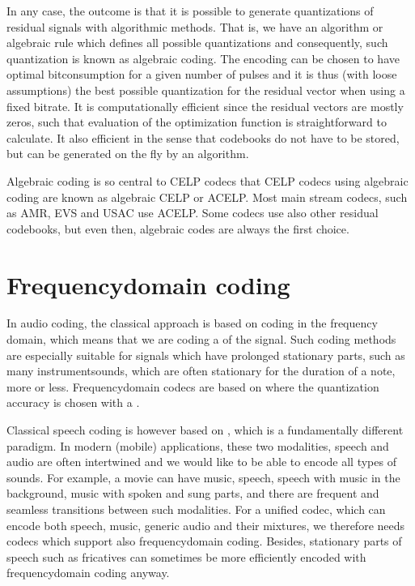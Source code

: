 \documentclass[letterpaper,10pt,english]{jupyterBook}
\begin{document}
\sphinxAtStartPar
In any case, the outcome is that it is possible to generate
quantizations of residual signals with algorithmic methods. That is, we
have an algorithm or algebraic rule which defines all possible
quantizations and consequently, such quantization is known as algebraic
coding. The encoding can be chosen to have optimal bit\sphinxhyphen{}consumption for a
given number of pulses and it is thus (with loose assumptions) the best
possible quantization for the residual vector when using a fixed
bitrate. It is computationally efficient since the residual vectors are
mostly zeros, such that evaluation of the optimization function is
straightforward to calculate. It also efficient in the sense that
codebooks do not have to be stored, but can be generated on the fly by
an algorithm.

\sphinxAtStartPar
Algebraic coding is so central to CELP codecs that CELP codecs using
algebraic coding are known as algebraic CELP or ACELP. Most main stream
codecs, such as AMR, EVS and USAC use ACELP. Some codecs use also other
residual codebooks, but even then, algebraic codes are always the first
choice.

\sphinxstepscope


\section{Frequency\sphinxhyphen{}domain coding}
\label{\detokenize{Transmission/Frequency-domain_coding:frequency-domain-coding}}\label{\detokenize{Transmission/Frequency-domain_coding::doc}}
\sphinxAtStartPar
In audio coding, the classical approach is based on coding in the
frequency domain, which means that we are coding a  of the signal. Such coding
methods are especially suitable for signals which have prolonged
stationary parts, such as many instrument\sphinxhyphen{}sounds, which are often
stationary for the duration of a note, more or less. Frequency\sphinxhyphen{}domain
codecs are based on {\hyperref[\detokenize{Transmission/Entropy_coding::doc}]{}} where the
quantization accuracy is chosen with a {\hyperref[\detokenize{Transmission/Perceptual_modelling_in_speech_and_audio_coding::doc}]{}}.

\sphinxAtStartPar
Classical speech coding is however based on , which is a
fundamentally different paradigm. In modern (mobile) applications, these
two modalities, speech and audio are often intertwined and we would like
to be able to encode all types of sounds. For example, a movie can have
music, speech, speech with music in the background, music with spoken
and sung parts, and there are frequent and seamless transitions between
such modalities. For a unified codec, which can encode both speech,
music, generic audio and their mixtures, we therefore needs codecs which
support also frequency\sphinxhyphen{}domain coding. Besides, stationary parts of
speech such as fricatives can sometimes be more efficiently encoded with
frequency\sphinxhyphen{}domain coding anyway.
\end{document}
